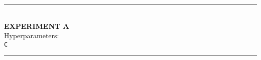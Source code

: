 \rule{0.5\textwidth}{0.5pt}\\

	{\large \textbf{EXPERIMENT A}}\\
	
	{\normalsize Hyperparameters:}\\
	\texttt{C}\\
\rule{0.5\textwidth}{0.5pt}\\